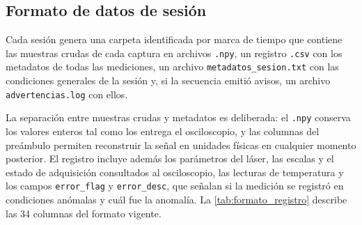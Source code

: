 \subsection{Formato de datos de sesión}
\label{sec:formato_datos}

Cada sesión genera una carpeta identificada por marca de tiempo que
contiene las muestras crudas de cada captura en archivos \texttt{.npy},
un registro \texttt{.csv} con los metadatos de todas las mediciones, un
archivo \texttt{metadatos\_sesion.txt} con las condiciones generales de
la sesión y, si la secuencia emitió avisos, un archivo
\texttt{advertencias.log} con ellos.

La separación entre muestras crudas y metadatos es deliberada: el
\texttt{.npy} conserva los valores enteros tal como los entrega el
osciloscopio, y las columnas del preámbulo permiten reconstruir la señal
en unidades físicas en cualquier momento posterior. El registro incluye
además los parámetros del láser, las escalas y el estado de adquisición
consultados al osciloscopio, las lecturas de temperatura y los campos
\texttt{error\_flag} y \texttt{error\_desc}, que señalan si la medición
se registró en condiciones anómalas y cuál fue la anomalía. La
\cref{tab:formato_registro} describe las 34 columnas del formato
vigente.

